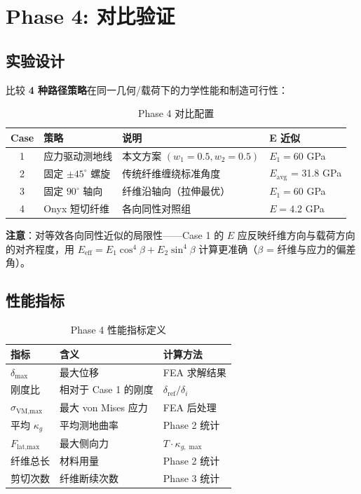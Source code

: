 \documentclass[11pt,a4paper]{article}
\begin{document}
\newpage
\section{Phase 4: 对比验证}

\subsection{实验设计}

比较 \textbf{4 种路径策略}在同一几何/载荷下的力学性能和制造可行性：

\begin{table}[H]
\centering
\begin{tabularx}{\textwidth}{c l X l}
\toprule
\textbf{Case} & \textbf{策略} & \textbf{说明} & \textbf{E 近似} \\
\midrule
1 & 应力驱动测地线 & 本文方案 $(w_1=0.5, w_2=0.5)$ & $E_1 = 60$ GPa \\
2 & 固定 $\pm 45^\circ$ 螺旋 & 传统纤维缠绕标准角度 & $E_{\text{avg}}$ = 31.8 GPa \\
3 & 固定 $90^\circ$ 轴向 & 纤维沿轴向（拉伸最优） & $E_1 = 60$ GPa \\
4 & Onyx 短切纤维 & 各向同性对照组 & $E = 4.2$ GPa \\
\bottomrule
\end{tabularx}
\caption{Phase 4 对比配置}
\end{table}

\textcolor{accent}{\textbf{注意}}：对等效各向同性近似的局限性——Case 1 的 $E$ 应反映纤维方向与载荷方向的对齐程度，用 $E_{\text{eff}} = E_1 \cos^4\beta + E_2 \sin^4\beta$ 计算更准确（$\beta$ = 纤维与应力的偏差角）。

\subsection{性能指标}

\begin{table}[H]
\centering
\begin{tabularx}{\textwidth}{l X l}
\toprule
\textbf{指标} & \textbf{含义} & \textbf{计算方法} \\
\midrule
$\delta_{\max}$ & 最大位移 & FEA 求解结果 \\
刚度比 & 相对于 Case 1 的刚度 & $\delta_{\text{ref}} / \delta_i$ \\
$\sigma_{\text{VM,max}}$ & 最大 von Mises 应力 & FEA 后处理 \\
平均 $\kappa_g$ & 平均测地曲率 & Phase 2 统计 \\
$F_{\text{lat,max}}$ & 最大侧向力 & $T \cdot \kappa_{g,\max}$ \\
纤维总长 & 材料用量 & Phase 2 统计 \\
剪切次数 & 纤维断续次数 & Phase 3 统计 \\
\bottomrule
\end{tabularx}
\caption{Phase 4 性能指标定义}
\end{table}
\end{document}

